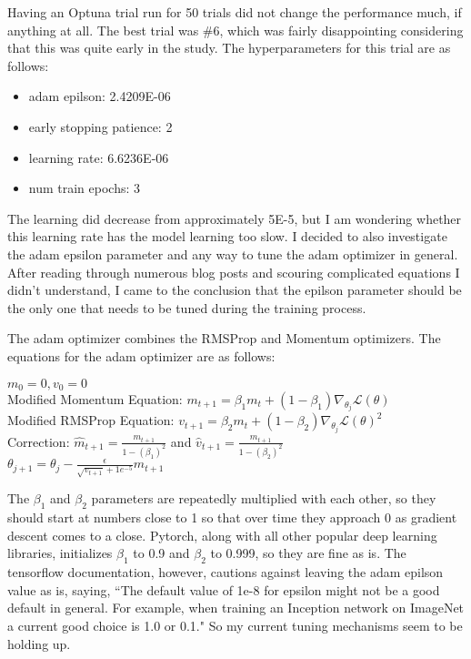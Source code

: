\documentclass[11pt,letterpaper]{article}
\begin{document}
Having an Optuna trial run for 50 trials did not change the performance much, if anything at all. The best trial was \#6, which was fairly disappointing considering that this was quite early in the study. The hyperparameters for this trial are as follows:

\begin{itemize}
   \item adam epilson: 2.4209E-06
   \item early stopping patience: 2
   \item learning rate: 6.6236E-06
   \item num train epochs: 3
\end{itemize}

The learning did decrease from approximately 5E-5, but I am wondering whether this learning rate has the model learning too slow. I decided to also investigate the adam epsilon parameter and any way to tune the adam optimizer in general. After reading through numerous blog posts and scouring complicated equations I didn't understand, I came to the conclusion that the epilson parameter should be the only one that needs to be tuned during the training process.  

The adam optimizer combines the RMSProp and Momentum optimizers. The equations for the adam optimizer are as follows: 

\begin{center}
$m_0 = 0, v_0 = 0$ \\
Modified Momentum Equation: $m_{t+1} = \beta_{1}m_t + (1 - \beta_{1})\nabla_{\theta_{j}}\mathcal{L}(\theta)$ \\
Modified RMSProp Equation: $v_{t+1} = \beta_{2}m_t + (1 - \beta_{2})\nabla_{\theta_{j}}\mathcal{L}(\theta)^2$ \\
Correction: $\hat{m}_{t+1} = \frac{m_{t+1}}{1-(\beta_1)^2}$ and $\hat{v}_{t+1} = \frac{m_{t+1}}{1-(\beta_2)^2}$ \\
$\theta_{j+1} = \theta_{j} - \frac{\epsilon}{\sqrt{v_{t+1}} + 1e^{-5}}m_{t+1}$
\end{center}

The $\beta_1$ and $\beta_2$ parameters are repeatedly multiplied with each other, so they should start at numbers close to 1 so that over time they approach 0 as gradient descent comes to a close. Pytorch, along with all other popular deep learning libraries, initializes $\beta_1$ to 0.9 and $\beta_2$ to 0.999, so they are fine as is. The tensorflow documentation, however, cautions against leaving the adam epilson value as is, saying, ``The default value of 1e-8 for epsilon might not be a good default in general. For example, when training an Inception network on ImageNet a current good choice is 1.0 or 0.1." So my current tuning mechanisms seem to be holding up.

\clearpage

\nocite{*}
\end{document}
